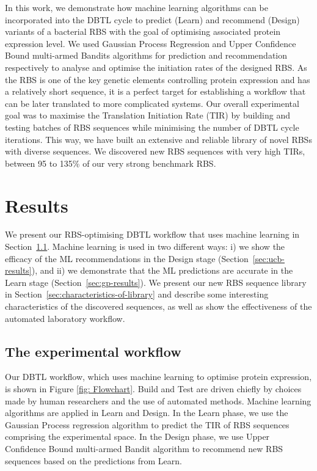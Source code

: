 \documentclass{article}
\begin{document}
In this work, we demonstrate how machine learning algorithms can be incorporated into the DBTL cycle to predict (Learn) and recommend (Design) variants of a bacterial RBS with the goal of optimising associated protein expression level. 
We used Gaussian Process Regression \cite{Rasmussen2004} and Upper Confidence Bound multi-armed Bandits algorithms \cite{desautels2014parallelizing} for prediction and recommendation respectively to analyse and optimise the initiation rates of the designed RBS.
As the RBS is one of the key genetic elements controlling protein expression and has a relatively short sequence, it is a perfect target for establishing a workflow that can be later translated to more complicated systems.
Our overall experimental goal was to maximise the Translation Initiation Rate (TIR) by building and testing batches of RBS sequences while minimising the number of DBTL cycle iterations.
This way, we have built an extensive and reliable library of novel RBSs with diverse sequences. We discovered new RBS sequences with very high TIRs, between 95 to 135\% of our very strong benchmark RBS. 

\section{Results}

We present our RBS-optimising DBTL workflow that uses machine learning in Section~\ref{sec:dbtl-workflow}.
Machine learning is used in two different ways: i) we show the efficacy of the ML recommendations
in the Design stage (Section~\ref{sec:ucb-results}),
and ii) we demonstrate that the ML predictions are accurate in the Learn stage (Section~\ref{sec:gp-results}).
We present our new RBS sequence library in Section~\ref{sec:characteristics-of-library} and describe some interesting
characteristics of the discovered sequences, 
as well as show the effectiveness of the automated laboratory workflow.

\subsection{The experimental workflow}
\label{sec:dbtl-workflow}

Our DBTL workflow, which uses machine learning to optimise protein expression, is shown in Figure \ref{fig: Flowchart}.
Build and Test are driven chiefly by choices made by human researchers and the use of automated methods.
Machine learning algorithms are applied in Learn and Design.
In the Learn phase, we use the Gaussian Process regression algorithm to predict the TIR of RBS sequences comprising the experimental space.
In the Design phase, we use Upper Confidence Bound multi-armed Bandit algorithm to recommend new RBS sequences based on the predictions from Learn.\\
\end{document}
